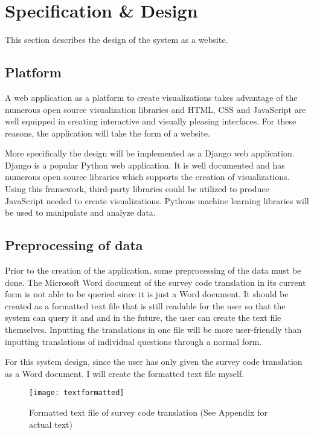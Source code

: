 \chapter{Specification \& Design} \label{ch:design}

This section describes the design of the system as a website.

\section{Platform}
A web application as a platform to create visualizations takes advantage of the numerous open source visualization libraries and HTML, CSS and JavaScript are well equipped in creating interactive and visually pleasing interfaces. For these reasons, the application will take the form of a website.\par

More specifically the design will be implemented as a Django \cite{django} web application. Django is a popular Python web application. It is well documented and has numerous open source libraries which supports the creation of visualizations. Using this framework, third-party libraries could be utilized to produce JavaScript needed to create visualizations. Python\textquotesingle s machine learning libraries will be used to manipulate and analyze data.

\section{Preprocessing of data} \label{preprocessing}
Prior to the creation of the application, some preprocessing of the data must be done. The Microsoft Word document of the survey code translation in its current form is not able to be queried since it is just a Word document. It should be created as a formatted text file that is still readable for the user so that the system can query it and and in the future, the user can create the text file themselves. Inputting the translations in one file will be more user-friendly than inputting translations of individual questions through a normal form.\par

For this system design, since the user has only given the survey code translation as a Word document. I will create the formatted text file myself.\par


\begin{figure}[h]
\centering
\texttt{[image: textformatted]}
\caption{Formatted text file of survey code translation (See Appendix for actual text)}
\end{figure}

